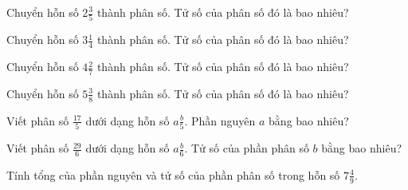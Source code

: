 
\begin{ex}
  Chuyển hỗn số $2\frac{3}{5}$ thành phân số. Tử số của phân số đó là bao nhiêu?
\end{ex}

\begin{ex}
  Chuyển hỗn số $3\frac{1}{4}$ thành phân số. Tử số của phân số đó là bao nhiêu?
\end{ex}

\begin{ex}
  Chuyển hỗn số $4\frac{2}{7}$ thành phân số. Tử số của phân số đó là bao nhiêu?
\end{ex}

\begin{ex}
  Chuyển hỗn số $5\frac{3}{8}$ thành phân số. Tử số của phân số đó là bao nhiêu?
\end{ex}

\begin{ex}
  Viết phân số $\frac{17}{5}$ dưới dạng hỗn số $a\frac{b}{5}$. Phần nguyên $a$ bằng bao nhiêu?
\end{ex}

\begin{ex}
  Viết phân số $\frac{29}{6}$ dưới dạng hỗn số $a\frac{b}{6}$. Tử số của phần phân số $b$ bằng bao nhiêu?
\end{ex}

\begin{ex}
  Tính tổng của phần nguyên và tử số của phần phân số trong hỗn số $7\frac{4}{9}$.
\end{ex}

